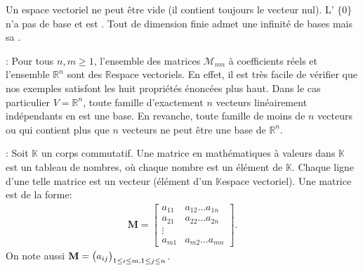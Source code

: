 \documentclass[letterpaper,11pt,english]{sphinxmanual}
\begin{document}
\begin{DUlineblock}{0em}
\item[]  Un espace vectoriel ne peut être vide (il contient toujours le
vecteur nul). L’ \(\{0\}\) n’a pas de
base et est . Tout 
de dimension finie admet une infinité de bases mais sa .
\item[] : Pour tous \(n,m\ge1\),
l’ensemble des matrices \(\mathcal{M}_{nm}\) à coefficients réels
et l’ensemble \(\mathbb{R}^n\) sont des \(\mathbb{R}\)\sphinxhyphen{}espace
vectoriels. En effet, il est très facile de vérifier que nos exemples
satisfont les huit propriétés énoncées plus haut. Dans le cas
particulier \(V=\mathbb{R}^n\), toute famille d’exactement
\(n\) vecteurs linéairement indépendants en est une base. En
revanche, toute famille de moins de \(n\) vecteurs ou qui contient
plus que \(n\) vecteurs ne peut être une base de
\(\mathbb{R}^n\).
\end{DUlineblock}

\sphinxAtStartPar
{}: Soit \(\mathbb{K}\) un corps commutatif. Une matrice
en mathématiques à valeurs dans \(\mathbb{K}\) est un tableau de
nombres, où chaque nombre est un élément de \(\mathbb{K}\). Chaque
ligne d’une telle matrice est un vecteur (élément d’un
\(\mathbb{K}\)\sphinxhyphen{}espace vectoriel). Une matrice est de la forme:
\begin{equation}\label{equation:chapter2:chapter2:2}
\begin{split}\mathbf{M}=\begin{bmatrix}
a_{11} &a_{12} \dots a_{1n}\\
a_{21} &a_{22} \dots a_{2n}\\
\vdots\\
a_{m1}& a_{m2} \dots a_{mn}
\end{bmatrix}.\end{split}
\end{equation}
\sphinxAtStartPar
On note aussi
\(\mathbf{M}=\big{(}a_{ij}\big{)}_{1\le i\le m, 1\le j\le n}\).
\end{document}
